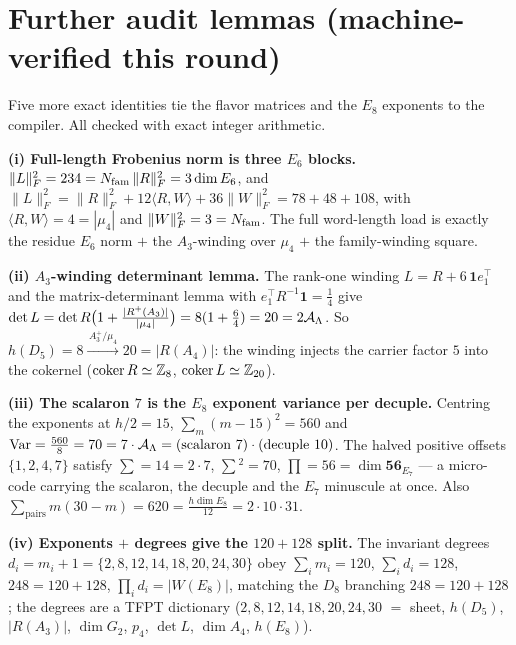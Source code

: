 \section{Further audit lemmas (machine-verified this round)}
Five more exact identities tie the flavor matrices and the $E_8$ exponents to the compiler. All checked
with exact integer arithmetic.

\par\smallskip\noindent\textbf{(i) Full-length Frobenius norm is three $E_6$ blocks.}
$\|L\|_F^2=234=N_{\mathrm{fam}}\,\|R\|_F^2=3\dim E_6$, and
$\|L\|_F^2=\|R\|_F^2+12\langle R,W\rangle+36\|W\|_F^2=78+48+108$,
with $\langle R,W\rangle=4=|\mu_4|$ and $\|W\|_F^2=3=N_{\mathrm{fam}}$. The full word-length load is exactly the
residue $E_6$ norm $+$ the $A_3$-winding over $\mu_4$ $+$ the family-winding square. \mE

\par\smallskip\noindent\textbf{(ii) $A_3$-winding determinant lemma.}
The rank-one winding $L=R+6\,\mathbf 1 e_1^\top$ and the matrix-determinant lemma with
$e_1^\top R^{-1}\mathbf 1=\tfrac14$ give
$\det L=\det R\bigl(1+\tfrac{|R^+(A_3)|}{|\mu_4|}\bigr)=8(1+\tfrac64)=20=2\mathcal A_\Lambda$.
So $h(D_5)=8\xrightarrow{\,A_3^+/\mu_4\,}20=|R(A_4)|$: the winding injects the carrier factor $5$ into
the cokernel ($\operatorname{coker}R\simeq\mathbb{Z}_8$, $\operatorname{coker}L\simeq\mathbb{Z}_{20}$). \mE

\par\smallskip\noindent\textbf{(iii) The scalaron $7$ is the $E_8$ exponent variance per decuple.}
Centring the exponents at $h/2=15$, $\sum_m(m-15)^2=560$ and
$\operatorname{Var}=\tfrac{560}{8}=70=7\cdot\mathcal A_\Lambda=(\text{scalaron }7)\cdot(\text{decuple }10)$.
The halved positive offsets $\{1,2,4,7\}$ satisfy $\sum=14=2\cdot7$, $\sum{}^2=70$, $\prod=56=\dim\mathbf{56}_{E_7}$
--- a micro-code carrying the scalaron, the decuple and the $E_7$ minuscule at once.
Also $\sum_{\text{pairs}}m(30-m)=620=\tfrac{h\dim E_8}{12}=2\cdot10\cdot31$. \mE

\par\smallskip\noindent\textbf{(iv) Exponents $+$ degrees give the $120{+}128$ split.}
The invariant degrees $d_i=m_i+1=\{2,8,12,14,18,20,24,30\}$ obey
$\sum_i m_i=120$, $\sum_i d_i=128$, $248=120+128$, $\prod_i d_i=|W(E_8)|$,
matching the $D_8$ branching $248=120+128$; the degrees are a TFPT dictionary
($2,8,12,14,18,20,24,30$ $=$ sheet, $h(D_5)$, $|R(A_3)|$, $\dim G_2$, $p_4$, $\det L$, $\dim A_4$, $h(E_8)$). \mE


